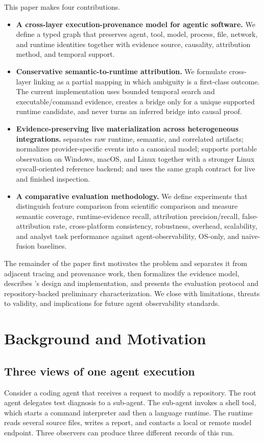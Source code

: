 This paper makes four contributions.
\begin{itemize}
  \item \textbf{A cross-layer execution-provenance model for agentic software.} We define a typed graph that preserves agent, tool, model, process, file, network, and runtime identities together with evidence source, causality, attribution method, and temporal support.
  \item \textbf{Conservative semantic-to-runtime attribution.} We formulate cross-layer linking as a partial mapping in which ambiguity is a first-class outcome. The current implementation uses bounded temporal search and executable/command evidence, creates a bridge only for a unique supported runtime candidate, and never turns an inferred bridge into causal proof.
  \item \textbf{Evidence-preserving live materialization across heterogeneous integrations.} \system separates raw runtime, semantic, and correlated artifacts; normalizes provider-specific events into a canonical model; supports portable observation on Windows, macOS, and Linux together with a stronger Linux syscall-oriented reference backend; and uses the same graph contract for live and finished inspection.
  \item \textbf{A comparative evaluation methodology.} We define experiments that distinguish feature comparison from scientific comparison and measure semantic coverage, runtime-evidence recall, attribution precision/recall, false-attribution rate, cross-platform consistency, robustness, overhead, scalability, and analyst task performance against agent-observability, OS-only, and naive-fusion baselines.
\end{itemize}

The remainder of the paper first motivates the problem and separates it from adjacent tracing and provenance work, then formalizes the evidence model, describes \system's design and implementation, and presents the evaluation protocol and repository-backed preliminary characterization. We close with limitations, threats to validity, and implications for future agent observability standards.

\section{Background and Motivation}
\subsection{Three views of one agent execution}
Consider a coding agent that receives a request to modify a repository. The root agent delegates test diagnosis to a sub-agent. The sub-agent invokes a shell tool, which starts a command interpreter and then a language runtime. The runtime reads several source files, writes a report, and contacts a local or remote model endpoint. Three observers can produce three different records of this run.

